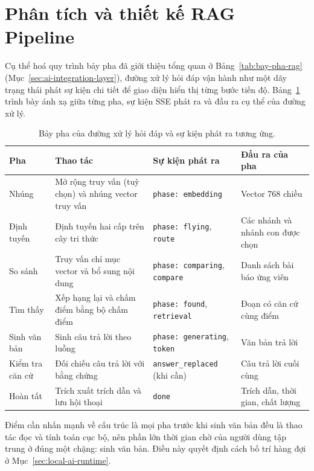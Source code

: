 \section{Phân tích và thiết kế RAG Pipeline}
\label{sec:rag-pipeline}

Cụ thể hoá quy trình bảy pha đã giới thiệu tổng quan ở Bảng~\ref{tab:bay-pha-rag} (Mục~\ref{sec:ai-integration-layer}), đường xử lý hỏi đáp vận hành như một dãy trạng thái phát sự kiện chi tiết để giao diện hiển thị từng bước tiến độ. Bảng~\ref{tab:bay-pha-chi-tiet} trình bày ánh xạ giữa từng pha, sự kiện SSE phát ra và đầu ra cụ thể của đường xử lý.

\begin{table}[htbp]
    \centering
    \caption{Bảy pha của đường xử lý hỏi đáp và sự kiện phát ra tương ứng.}
    \label{tab:bay-pha-chi-tiet}
    \small
    \begin{tabularx}{\textwidth}{@{}>{\raggedright\arraybackslash}p{2.3cm}>{\raggedright\arraybackslash}p{4.3cm}>{\raggedright\arraybackslash}p{3.6cm}>{\raggedright\arraybackslash}X@{}}
        \toprule
        \textbf{Pha} & \textbf{Thao tác} & \textbf{Sự kiện phát ra} & \textbf{Đầu ra của pha} \\
        \midrule
        Nhúng & Mở rộng truy vấn (tuỳ chọn) và nhúng vector truy vấn & \texttt{phase: embedding} & Vector 768 chiều \\
        Định tuyến & Định tuyến hai cấp trên cây tri thức & \texttt{phase: flying}, \texttt{route} & Các nhánh và nhánh con được chọn \\
        So sánh & Truy vấn chỉ mục vector và bổ sung nội dung & \texttt{phase: comparing}, \texttt{compare} & Danh sách bài báo ứng viên \\
        Tìm thấy & Xếp hạng lại và chấm điểm bằng bộ chấm điểm & \texttt{phase: found}, \texttt{retrieval} & Đoạn có căn cứ cùng điểm \\
        Sinh văn bản & Sinh câu trả lời theo luồng & \texttt{phase: generating}, \texttt{token} & Văn bản trả lời \\
        Kiểm tra căn cứ & Đối chiếu câu trả lời với bằng chứng & \texttt{answer\_replaced} (khi cần) & Câu trả lời cuối cùng \\
        Hoàn tất & Trích xuất trích dẫn và lưu hội thoại & \texttt{done} & Trích dẫn, thời gian, chất lượng \\
        \bottomrule
    \end{tabularx}
\end{table}

Điểm cần nhấn mạnh về cấu trúc là mọi pha trước khi sinh văn bản đều là thao tác đọc và tính toán cục bộ, nên phần lớn thời gian chờ của người dùng tập trung ở đúng một chặng: sinh văn bản. Điều này quyết định cách bố trí hàng đợi ở Mục~\ref{sec:local-ai-runtime}.

